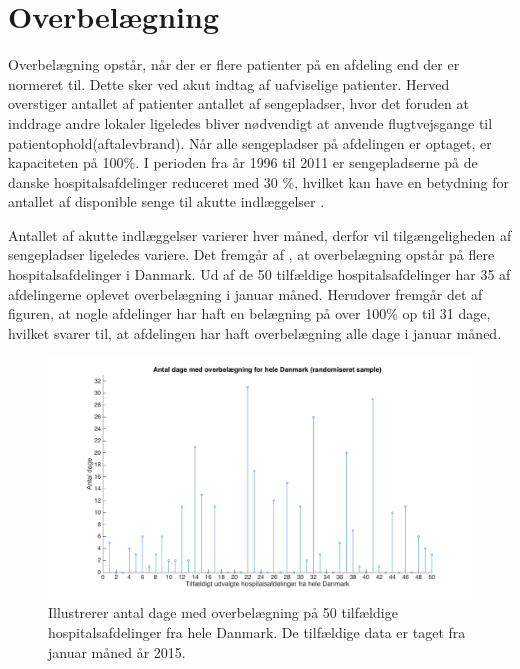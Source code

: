 \section{Overbelægning}\label{sec:overbelaegning}

Overbelægning opstår, når der er flere patienter på en afdeling end der er normeret til\cite{Heidmann2014}. Dette sker ved akut indtag af uafviselige patienter. Herved overstiger antallet af patienter antallet af sengepladser, hvor det foruden at inddrage andre lokaler ligeledes bliver nødvendigt at anvende flugtvejsgange til patientophold(aftalevbrand). Når alle sengepladser på afdelingen er optaget, er kapaciteten på 100\%. I perioden fra år 1996 til 2011 er sengepladserne på de danske hospitalsafdelinger reduceret med 30 \%, hvilket kan have en betydning for antallet af disponible senge til akutte indlæggelser \cite{Madsen2014}. 

Antallet af akutte indlæggelser varierer hver måned, derfor vil tilgængeligheden af sengepladser ligeledes variere. Det fremgår af , at overbelægning opstår på flere hospitalsafdelinger i Danmark. Ud af de 50 tilfældige hospitalsafdelinger har 35 af afdelingerne oplevet overbelægning i januar måned. Herudover fremgår det af figuren, at nogle afdelinger har haft en belægning på over 100\% op til 31 dage, hvilket svarer til, at afdelingen har haft overbelægning alle dage i januar måned. 

\begin{figure}[H]
\centering
\includegraphics[width=1\textwidth]{figures/overbelaegning_ran}
\caption{Illustrerer antal dage med overbelægning på 50 tilfældige hospitalsafdelinger fra hele Danmark. De tilfældige data er taget fra januar måned år 2015. \cite{SDS2015}} 
\label{fig:overbelaegning_ran}
\end{figure}


